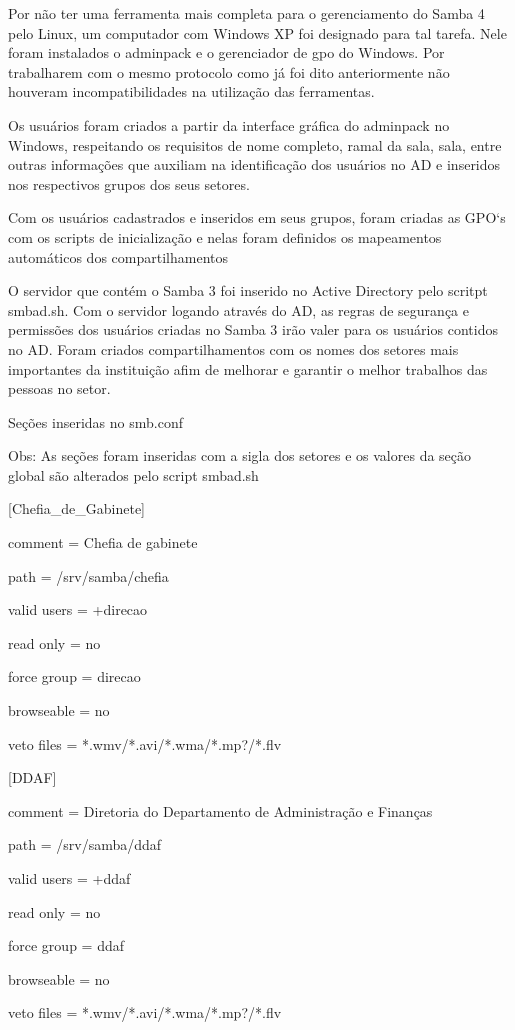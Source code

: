 Por não ter uma ferramenta mais completa para o gerenciamento do Samba 4 pelo Linux, um computador com Windows XP foi designado para tal tarefa. Nele foram instalados o adminpack e o gerenciador de gpo do Windows. Por trabalharem com o mesmo protocolo como já foi dito anteriormente não houveram incompatibilidades na utilização das ferramentas.

Os usuários foram criados a partir da interface gráfica do adminpack no Windows, respeitando os requisitos de nome completo, ramal da sala, sala, entre outras informações que auxiliam na identificação dos usuários no AD e inseridos nos respectivos grupos dos seus setores.

Com os usuários cadastrados e inseridos em seus grupos, foram criadas as GPO`s com os scripts de inicialização e nelas foram definidos os mapeamentos automáticos dos compartilhamentos

O servidor que contém o Samba 3 foi inserido no Active Directory pelo scritpt smbad.sh. Com o servidor logando através do AD, as regras de segurança e permissões dos usuários criadas no Samba 3 irão valer para os usuários contidos no AD. Foram criados compartilhamentos com os nomes dos setores mais importantes da instituição afim de melhorar e garantir o melhor trabalhos das pessoas no setor.

Seções inseridas no smb.conf

Obs:  As seções foram inseridas com a sigla dos setores e os valores da seção global são alterados pelo script smbad.sh

[Chefia\_de\_Gabinete]

comment = Chefia de gabinete

path = /srv/samba/chefia

valid users = +direcao

read only = no

force group = direcao

browseable = no

veto files = *.wmv/*.avi/*.wma/*.mp?/*.flv

[DDAF] 

comment = Diretoria do Departamento de Administração e Finanças

path = /srv/samba/ddaf

valid users = +ddaf

read only = no

force group = ddaf

browseable = no

veto files = *.wmv/*.avi/*.wma/*.mp?/*.flv

